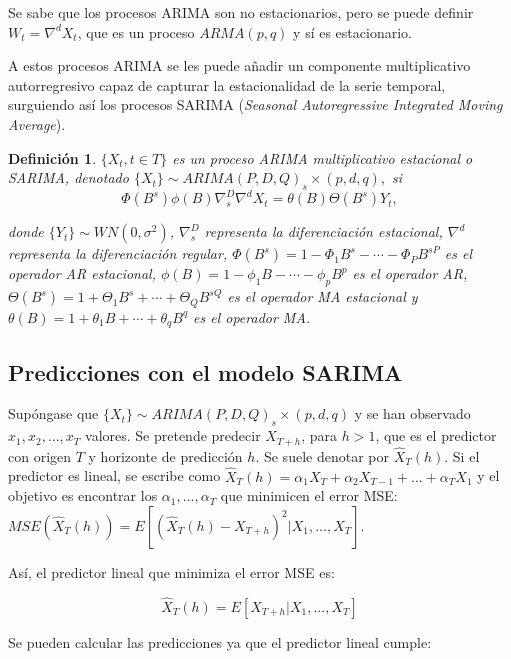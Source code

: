 \documentclass[12pt,twoside]{article}
\newtheorem{definition}[theorem]{Definición}
\begin{document}
Se sabe que los procesos ARIMA son no estacionarios, pero se puede definir $W_t = \nabla^dX_t$, que es un proceso $ARMA(p,q)$ y sí es estacionario.

A estos procesos ARIMA se les puede añadir un componente multiplicativo autorregresivo capaz de capturar la estacionalidad de la serie temporal, surguiendo así los procesos SARIMA (\textit{Seasonal Autoregressive Integrated Moving Average}).

\begin{definition}
$\{X_t, t \in T\}$ es un proceso ARIMA multiplicativo estacional o SARIMA, denotado $\{X_t\} \sim ARIMA(P,D,Q)_s \times (p,d,q),$ si
\begin{equation}
\Phi(B^s)\phi(B)\nabla_s^D \nabla^d X_t = \theta(B)\Theta(B^s)Y_t,
\end{equation}

donde $\{Y_t\} \sim WN(0, \sigma^2)$, $\nabla_s^D$ representa la diferenciación estacional, $\nabla^d$ representa la diferenciación regular, $\Phi(B^s) = 1 - \Phi_1 B^s - \cdots - \Phi_P B^{sP}$ es el operador AR estacional, $\phi(B) = 1 - \phi_1 B - \cdots - \phi_p B^p$ es el operador AR, $\Theta(B^s) = 1 + \Theta_1 B^s + \cdots + \Theta_Q B^{sQ}$ es el operador MA estacional y $\theta(B) = 1 + \theta_1 B + \cdots + \theta_q B^q$ es el operador MA.
\end{definition}


\subsection{Predicciones con el modelo SARIMA}\label{sec:35}
Supóngase que $\{X_t\}\sim ARIMA(P,D,Q)_s \times (p,d,q)$ y se han observado $x_1, x_2, ..., x_T$ valores. Se pretende predecir $X_{T+h}$, para $h>1$, que es el predictor con origen $T$ y horizonte de predicción $h$. Se suele denotar por $\hat{X}_T(h)$. Si el predictor es lineal, se escribe como $\hat{X}_T(h) = \alpha_1X_T+\alpha_2X_{T-1}+...+\alpha_TX_1$ y el objetivo es encontrar los $\alpha_1,...,\alpha_T$ que minimicen el error MSE: $MSE(\hat{X}_T(h))=E[(\hat{X}_T(h)-X_{T+h})^2|X_1,...,X_T]$.

Así, el predictor lineal que minimiza el error MSE es:

\begin{equation}
\hat{X}_T(h) = E[X_{T+h}|X_1,...,X_T] 
\end{equation}

Se pueden calcular las predicciones ya que el predictor lineal cumple:
\end{document}
